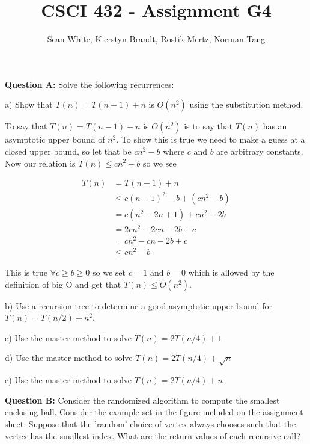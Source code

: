 \documentclass[12pt]{article}
\author{Sean White, Kierstyn Brandt, Rostik Mertz, Norman Tang}
\title{CSCI 432 - Assignment G4}
\begin{document}
\maketitle

\noindent
\textbf{Question A:} Solve the following recurrences: \smallskip

a) Show that $T(n) = T(n - 1) + n$ is $O(n^2)$ using the substitution method.\smallskip

To say that $T(n) = T(n - 1) + n$ is $O(n^2)$ is to say that $T(n)$ has an asymptotic upper bound of $n^2$. To show this is true we need to make a guess at a closed upper bound, so let that be $cn^2 - b$ where $c$ and $b$ are arbitrary constants. Now our relation is $T(n) \leq cn^2 -b$ so we see

\begin{align*}
T(n) &= T(n - 1) + n\\
&\leq c(n-1)^2 - b + (cn^2 - b)\\
&= c(n^2 - 2n + 1) + cn^2 -2b\\
&= 2cn^2 - 2cn - 2b + c\\
&= cn^2 - cn - 2b + c\\
&\leq cn^2 - b
\end{align*}

This is true $\forall c \geq b \geq 0$ so we set $c = 1$ and $b = 0$ which is allowed by the definition of big O and get that $T(n) \leq O(n^2)$.
\bigskip

b) Use a recursion tree to determine a good asymptotic upper bound for $T(n) = T(n/2) + n^2$. \smallskip

c) Use the master method to solve $T(n) = 2T(n/4) + 1$ \smallskip

d) Use the master method to solve $T(n) = 2T(n/4) + \sqrt{n}$ \smallskip

e) Use the master method to solve $T(n) = 2T(n/4) + n$ \smallskip

\noindent
\textbf{Question B:} Consider the randomized algorithm to compute the smallest enclosing ball. Consider the example set in the figure included on the assignment sheet. Suppose that the 'random' choice of vertex always chooses such that the vertex has the smallest index. What are the return values of each recursive call? \smallskip
\end{document}
